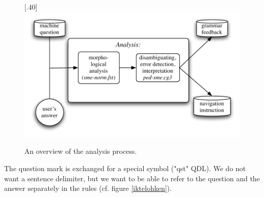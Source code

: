 \documentclass[11pt]{article}
\begin{document}
\begin{figure}[tbp]
\begin{center}
\scalebox{.45}[.40]{\includegraphics{presentation/img/qa2.pdf}}
\caption{An overview of the analysis process.}
\label{qasystem}
\end{center}
\end{figure}

The question mark is exchanged for a special symbol ("qst" QDL). We do not want a sentence delimiter, but we want to be able to refer to the question and the answer separately in the rules (cf. figure \ref{iktelohken}).
\end{document}
